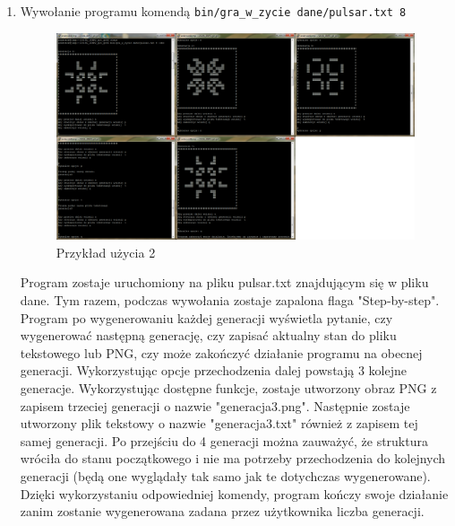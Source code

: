 \documentclass[12pt]{report}
\newcommand{\code}[1]{\texttt{#1}}
\begin{document}
\begin{enumerate}
    \item Wywołanie programu komendą \code{bin/gra\_w\_zycie dane/pulsar.txt 8}\par
    \begin{figure}[H]
    \centering
    \includegraphics[width=14cm]{obrazy/przykladuzycia_2.png}
    \caption{Przykład użycia 2}
    \label{przyklad uzycia 2}
    \end{figure}\par
    Program zostaje uruchomiony na pliku pulsar.txt znajdującym się w pliku dane. Tym razem, podczas wywołania zostaje zapalona flaga "Step-by-step". Program po wygenerowaniu każdej generacji wyświetla pytanie, czy wygenerować następną generację, czy zapisać aktualny stan do pliku tekstowego lub PNG, czy może zakończyć działanie programu na obecnej generacji. Wykorzystując opcje przechodzenia dalej powstają 3 kolejne generacje. Wykorzystując dostępne funkcje, zostaje utworzony obraz PNG z zapisem trzeciej generacji o nazwie "generacja3.png". Następnie zostaje utworzony plik tekstowy o nazwie "generacja3.txt" również z zapisem tej samej generacji. Po przejściu do 4 generacji można zauważyć, że struktura wróciła do stanu początkowego i nie ma potrzeby przechodzenia do kolejnych generacji (będą one wyglądały tak samo jak te dotychczas wygenerowane). Dzięki wykorzystaniu odpowiedniej komendy, program kończy swoje działanie zanim zostanie wygenerowana zadana przez użytkownika liczba generacji.
\end{enumerate}
\end{document}
